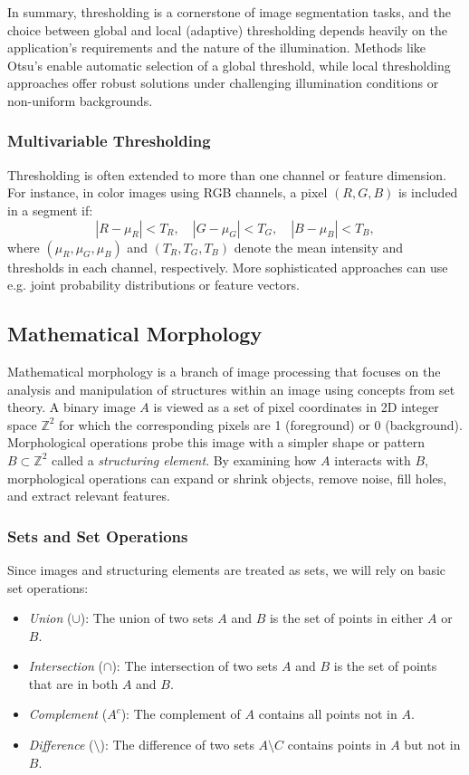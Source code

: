 \documentclass[a4paper,12pt]{article}
\begin{document}
In summary, thresholding is a cornerstone of image segmentation tasks, and the choice between global and local (adaptive) thresholding depends heavily on the application’s requirements and the nature of the illumination. Methods like Otsu's enable automatic selection of a global threshold, while local thresholding approaches offer robust solutions under challenging illumination conditions or non-uniform backgrounds.

\subsubsection{Multivariable Thresholding}

Thresholding is often extended to more than one channel or feature dimension. For instance, in color images using RGB channels, a pixel \((R, G, B)\) is included in a segment if:
\begin{equation}
    |R - \mu_R| < T_R, \quad |G - \mu_G| < T_G, \quad |B - \mu_B| < T_B,
\end{equation}
where \((\mu_R, \mu_G, \mu_B)\) and \((T_R, T_G, T_B)\) denote the mean intensity and thresholds in each channel, respectively. More sophisticated approaches can use e.g. joint probability distributions or feature vectors.

\subsection{Mathematical Morphology}

Mathematical morphology is a branch of image processing that focuses on the analysis and manipulation of structures within an image using concepts from set theory. A binary image \(A\) is viewed as a set of pixel coordinates in 2D integer space \(\mathbb{Z}^2\) for which the corresponding pixels are 1 (foreground) or 0 (background). Morphological operations probe this image with a simpler shape or pattern \(B \subset \mathbb{Z}^2\) called a \emph{structuring element}. By examining how \(A\) interacts with \(B\), morphological operations can expand or shrink objects, remove noise, fill holes, and extract relevant features.

\subsubsection{Sets and Set Operations}

Since images and structuring elements are treated as sets, we will rely on basic set operations:
\begin{itemize}
    \item \emph{Union} (\(\cup\)): The union of two sets \(A\) and \(B\) is the set of points in either \(A\) or \(B\).
    \item \emph{Intersection} (\(\cap\)): The intersection of two sets \(A\) and \(B\) is the set of points that are in both \(A\) and \(B\).
    \item \emph{Complement} (\(A^c\)): The complement of \(A\) contains all points not in \(A\).
    \item \emph{Difference} (\(\setminus\)): The difference of two sets \(A \setminus C\) contains points in \(A\) but not in \(B\).
\end{itemize}
\end{document}
